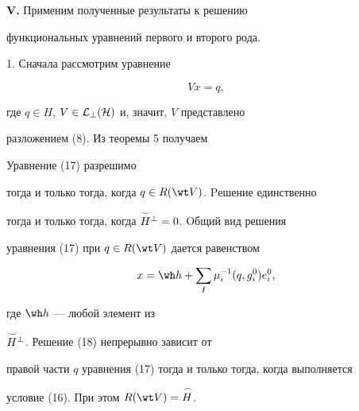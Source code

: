  


{\bf V.} Применим полученные результаты к решению 


функциональных уравнений первого и второго рода. 


\smallskip 


 


1. Сначала рассмотрим уравнение 


\begin{equation} 


V x=q,


\end{equation} 


где $q\in H$, $V\in\cal L_\bot(H)$ и, значит, $V$ представлено 


разложением (8). Из теоремы 5 получаем 


 


\begin{cor} 


Уравнение (17) разрешимо 


тогда и только тогда, когда $q\in R(\wt V)$. Pешение единственно 


тогда и только тогда, когда $\overset{\,\smile}{H}{}^\bot=0$. Oбщий вид решения 


уравнения (17) при $q\in R(\wt V)$ дается равенством 


\begin{equation} 


x=\wh h+\sum_I\mu^{-1}_i(q,g^0_i)e^0_i, 


\end{equation} 


где $\wh h$ --- любой элемент из 


$\overset{\,\smile}{H}{}^\bot$. Решение (18) непрерывно зависит от 


правой части $q$ уравнения (17) тогда и только тогда, когда выполняется 


условие (16). При этом $R(\wt V)=\up{\frown}{H}$. 


\end{cor} 


 


